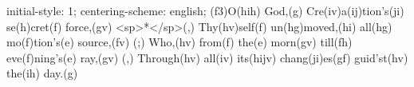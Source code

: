 initial-style: 1;
centering-scheme: english;
(f3)O(hih) God,(g) Cre(iv)a(ij)tion's(ji) se(h)cret(f) force,(gv) <sp>*</sp>(,)
Thy(hv)self(f) un(hg)moved,(hi) all(hg) mo(f)tion's(e) source,(fv) (;)
Who,(hv) from(f) the(e) morn(gv) till(fh) eve(f)ning's(e) ray,(gv) (,)
Through(hv) all(iv) its(hijv) chang(ji)es(gf) guid'st(hv) the(ih) day.(g)

